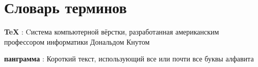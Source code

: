 \chapter*{Словарь терминов}             %

\textbf{TeX} : Cистема компьютерной вёрстки, разработанная
американским профессором информатики Дональдом Кнутом

\textbf{панграмма} : Короткий текст, использующий все или почти все
буквы алфавита
